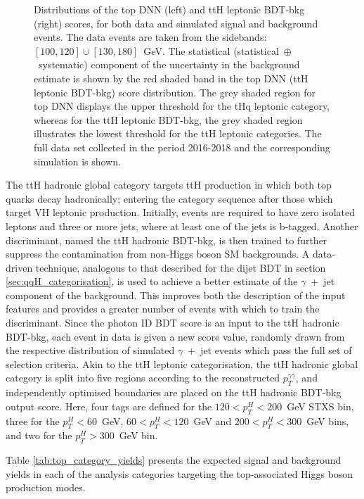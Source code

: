 \begin{figure}[htb]
  \caption[Output scores of two discriminants used for the top-associated production mode categories]
  {
    Distributions of the top DNN (left) and ttH leptonic BDT-bkg (right) scores, for both data and simulated signal and background events. The data events are taken from the \mgg sidebands: $[100,120]\cup[130,180]$~GeV. The statistical (statistical~$\oplus$~systematic) component of the uncertainty in the background estimate is shown by the red shaded band in the top DNN (ttH leptonic BDT-bkg) score distribution. The grey shaded region for top DNN displays the upper threshold for the tHq leptonic category, whereas for the ttH leptonic BDT-bkg, the grey shaded region illustrates the lowest threshold for the ttH leptonic categories. The full data set collected in the period 2016-2018 and the corresponding simulation is shown.
  }
  \label{fig:categorisation_top}
\end{figure}

The ttH hadronic global category targets ttH production in which both top quarks decay hadronically; entering the category sequence after those which target VH leptonic production. Initially, events are required to have zero isolated leptons and three or more jets, where at least one of the jets is b-tagged. Another discriminant, named the ttH hadronic BDT-bkg, is then trained to further suppress the contamination from non-Higgs boson SM backgrounds. A data-driven technique, analogous to that described for the dijet BDT in section \ref{sec:qqH_categorisation}, is used to achieve a better estimate of the $\gamma$~+~jet component of the background. This improves both the description of the input features and provides a greater number of events with which to train the discriminant. Since the photon ID BDT score is an input to the ttH hadronic BDT-bkg, each event in data is given a new score value, randomly drawn from the respective distribution of simulated $\gamma$~+~jet events which pass the full set of selection criteria. Akin to the ttH leptonic categorisation, the ttH hadronic global category is split into five regions according to the reconstructed $p_T^{\gamma\gamma}$, and independently optimised boundaries are placed on the ttH hadronic BDT-bkg output score. Here, four tags are defined for the $120<p_T^H<200$~GeV STXS bin, three for the $p_T^H<60$~GeV, $60<p_T^H<120$~GeV and $200<p_T^H<300$~GeV bins, and two for the $p_T^H>300$~GeV bin.

Table \ref{tab:top_category_yields} presents the expected signal and background yields in each of the analysis categories targeting the top-associated Higgs boson production modes.

